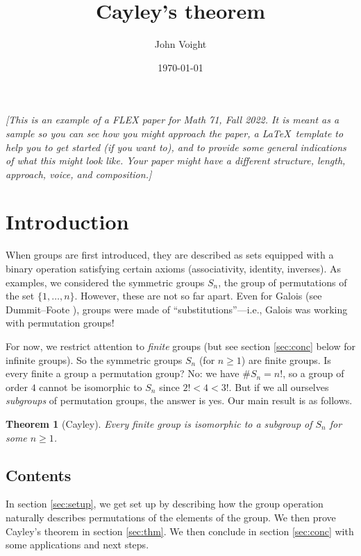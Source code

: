 \documentclass[12pt]{amsart}
\numberwithin{equation}{section}
\newtheorem{thm}[equation]{Theorem}
\theoremstyle{definition}
\theoremstyle{remark}
\numberwithin{equation}{section}
\begin{document}
\title{Cayley's theorem}
\author{John Voight}
\date{\today}

\maketitle

\emph{[This is an example of a FLEX paper for Math 71, Fall 2022.  It is meant as a sample so you can see how you might approach the paper, a \LaTeX\ template to help you to get started (if you want to), and to provide some general indications of what this might look like.  Your paper might have a different structure, length, approach, voice, and composition.]}

\section{Introduction} \label{sec:intro}

When groups are first introduced, they are described as sets equipped with a binary operation satisfying certain axioms (associativity, identity, inverses).  As examples, we considered the symmetric groups $S_n$, the group of permutations of the set $\{1,\dots,n\}$.  However, these are not so far apart.  Even for Galois (see Dummit--Foote \cite[p.~14 (3)]{DummitFoote}), groups were made of ``substitutions''---i.e., Galois was working with permutation groups!  

For now, we restrict attention to \emph{finite} groups (but see section \ref{sec:conc} below for infinite groups).  So the symmetric groups $S_n$ (for $n \geq 1$) are finite groups.  Is every finite a group a permutation group?  No: we have $\#S_n=n!$, so a group of order $4$ cannot be isomorphic to $S_n$ since $2! < 4 < 3!$.  But if we all ourselves \emph{subgroups} of permutation groups, the answer is yes.  Our main result is as follows.

\begin{thm}[Cayley] \label{thm:cayley}
Every finite group is isomorphic to a subgroup of $S_n$ for some $n \geq 1$.
\end{thm}

\subsection*{Contents} In section \ref{sec:setup}, we get set up by describing how the group operation naturally describes permutations of the elements of the group.  We then prove Cayley's theorem in section \ref{sec:thm}.  We then conclude in section \ref{sec:conc} with some applications and next steps.
\end{document}
